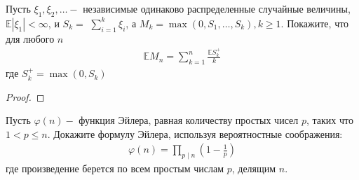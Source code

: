     \begin{prob}
        Пусть $\xi_{1}, \xi_{2}, \ldots-$ независимые одинаково распределенные случайные величины, $\mathbb{E}\left|\xi_{1}\right|<\infty$, и $S_{k}=$ $\sum_{i=1}^{k} \xi_{i}$, а $M_{k}=\max \left(0, S_{1}, \ldots, S_{k}\right), k \geq 1 .$ Покажите, что для любого $n$
        \begin{gather*}
            \mathbb{E} M_{n}=\sum_{k=1}^{n} \frac{\mathbb{E} S_{k}^{+}}{k}
        \end{gather*}
        где $S_{k}^{+}=\max \left(0, S_{k}\right)$
    \end{prob}
    \begin{proof}
    \end{proof}
\vskip 0.6in



    \begin{prob}
        Пусть $\varphi(n)-$ функция Эйлера, равная количеству простых чисел $p$, таких что $1<p \leq n$. Докажите формулу Эйлера, используя вероятностные соображения:
        \begin{gather*}
            \varphi(n)=\prod_{p \mid n}\left(1-\frac{1}{p}\right)
        \end{gather*}
        где произведение берется по всем простым числам $p$, делящим $n$.
    \end{prob}
